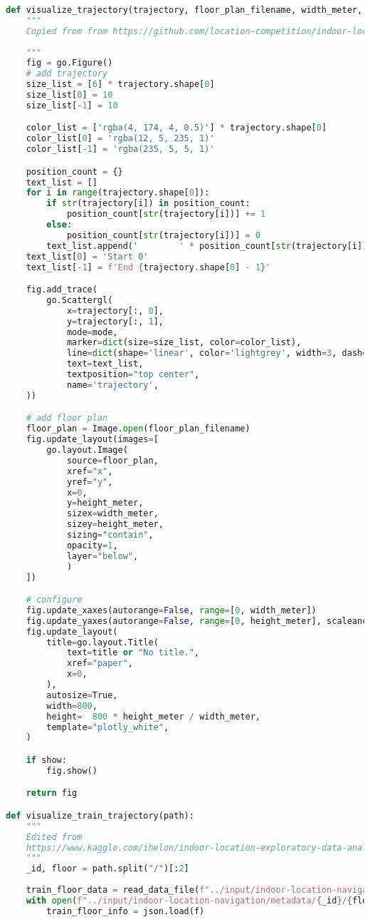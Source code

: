 \documentclass{article}
\begin{document}
\begin{latin}
\begin{lstlisting}[language=Python]
def visualize_trajectory(trajectory, floor_plan_filename, width_meter, height_meter, title=None, mode='lines + markers + text', show=False):
	"""
	Copied from from https://github.com/location-competition/indoor-location-competition-20/blob/master/visualize_f.py
	
	"""
	fig = go.Figure()	
	# add trajectory
	size_list = [6] * trajectory.shape[0]
	size_list[0] = 10
	size_list[-1] = 10

	color_list = ['rgba(4, 174, 4, 0.5)'] * trajectory.shape[0]
	color_list[0] = 'rgba(12, 5, 235, 1)'
	color_list[-1] = 'rgba(235, 5, 5, 1)'

	position_count = {}
	text_list = []
	for i in range(trajectory.shape[0]):
		if str(trajectory[i]) in position_count:
			position_count[str(trajectory[i])] += 1
		else:
			position_count[str(trajectory[i])] = 0
		text_list.append('        ' * position_count[str(trajectory[i])] + f'{i}')
	text_list[0] = 'Start 0'
	text_list[-1] = f'End {trajectory.shape[0] - 1}'

	fig.add_trace(
		go.Scattergl(
			x=trajectory[:, 0],
			y=trajectory[:, 1],
			mode=mode,
			marker=dict(size=size_list, color=color_list),
			line=dict(shape='linear', color='lightgrey', width=3, dash='dash'),
			text=text_list,
			textposition="top center",
			name='trajectory',
	))

	# add floor plan
	floor_plan = Image.open(floor_plan_filename)
	fig.update_layout(images=[
		go.layout.Image(
			source=floor_plan,
			xref="x",
			yref="y",
			x=0,
			y=height_meter,
			sizex=width_meter,
			sizey=height_meter,
			sizing="contain",
			opacity=1,
			layer="below",
			)
	])

	# configure
	fig.update_xaxes(autorange=False, range=[0, width_meter])
	fig.update_yaxes(autorange=False, range=[0, height_meter], scaleanchor="x", scaleratio=1)
	fig.update_layout(
		title=go.layout.Title(
			text=title or "No title.",
			xref="paper",
			x=0,
		),
		autosize=True,
		width=800,
		height=  800 * height_meter / width_meter,
		template="plotly_white",
	)

	if show:
		fig.show()

	return fig

def visualize_train_trajectory(path):
	"""
	Edited from 
	https://www.kaggle.com/ihelon/indoor-location-exploratory-data-analysis
	"""
	_id, floor = path.split("/")[:2]
	
	train_floor_data = read_data_file(f"../input/indoor-location-navigation/train/{path}")
	with open(f"../input/indoor-location-navigation/metadata/{_id}/{floor}/floor_info.json") as f:
		train_floor_info = json.load(f)
	

\end{lstlisting}
\end{latin}
\end{document}
